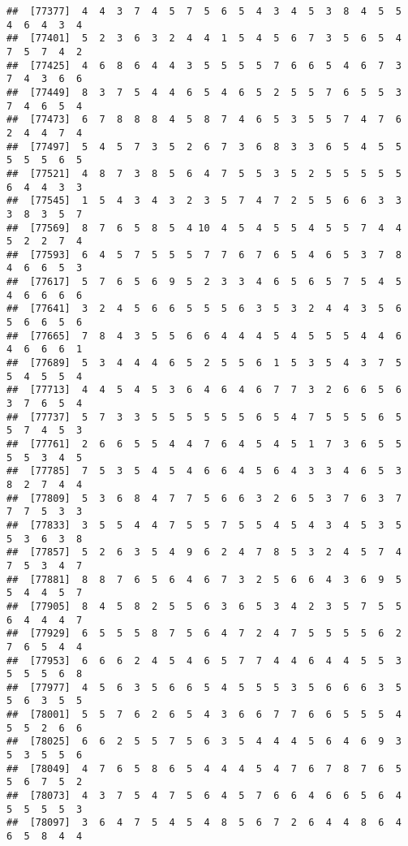 \documentclass[
]{book}
\begin{document}
\begin{verbatim}
##  [77377]  4  4  3  7  4  5  7  5  6  5  4  3  4  5  3  8  4  5  5  4  6  4  3  4
##  [77401]  5  2  3  6  3  2  4  4  1  5  4  5  6  7  3  5  6  5  4  7  5  7  4  2
##  [77425]  4  6  8  6  4  4  3  5  5  5  5  7  6  6  5  4  6  7  3  7  4  3  6  6
##  [77449]  8  3  7  5  4  4  6  5  4  6  5  2  5  5  7  6  5  5  3  7  4  6  5  4
##  [77473]  6  7  8  8  8  4  5  8  7  4  6  5  3  5  5  7  4  7  6  2  4  4  7  4
##  [77497]  5  4  5  7  3  5  2  6  7  3  6  8  3  3  6  5  4  5  5  5  5  5  6  5
##  [77521]  4  8  7  3  8  5  6  4  7  5  5  3  5  2  5  5  5  5  5  6  4  4  3  3
##  [77545]  1  5  4  3  4  3  2  3  5  7  4  7  2  5  5  6  6  3  3  3  8  3  5  7
##  [77569]  8  7  6  5  8  5  4 10  4  5  4  5  5  4  5  5  7  4  4  5  2  2  7  4
##  [77593]  6  4  5  7  5  5  5  7  7  6  7  6  5  4  6  5  3  7  8  4  6  6  5  3
##  [77617]  5  7  6  5  6  9  5  2  3  3  4  6  5  6  5  7  5  4  5  4  6  6  6  6
##  [77641]  3  2  4  5  6  6  5  5  5  6  3  5  3  2  4  4  3  5  6  5  6  6  5  6
##  [77665]  7  8  4  3  5  5  6  6  4  4  4  5  4  5  5  5  4  4  6  4  6  6  6  1
##  [77689]  5  3  4  4  4  6  5  2  5  5  6  1  5  3  5  4  3  7  5  5  4  5  5  4
##  [77713]  4  4  5  4  5  3  6  4  6  4  6  7  7  3  2  6  6  5  6  3  7  6  5  4
##  [77737]  5  7  3  3  5  5  5  5  5  5  6  5  4  7  5  5  5  6  5  5  7  4  5  3
##  [77761]  2  6  6  5  5  4  4  7  6  4  5  4  5  1  7  3  6  5  5  5  5  3  4  5
##  [77785]  7  5  3  5  4  5  4  6  6  4  5  6  4  3  3  4  6  5  3  8  2  7  4  4
##  [77809]  5  3  6  8  4  7  7  5  6  6  3  2  6  5  3  7  6  3  7  7  7  5  3  3
##  [77833]  3  5  5  4  4  7  5  5  7  5  5  4  5  4  3  4  5  3  5  5  3  6  3  8
##  [77857]  5  2  6  3  5  4  9  6  2  4  7  8  5  3  2  4  5  7  4  7  5  3  4  7
##  [77881]  8  8  7  6  5  6  4  6  7  3  2  5  6  6  4  3  6  9  5  5  4  4  5  7
##  [77905]  8  4  5  8  2  5  5  6  3  6  5  3  4  2  3  5  7  5  5  6  4  4  4  7
##  [77929]  6  5  5  5  8  7  5  6  4  7  2  4  7  5  5  5  5  6  2  7  6  5  4  4
##  [77953]  6  6  6  2  4  5  4  6  5  7  7  4  4  6  4  4  5  5  3  5  5  5  6  8
##  [77977]  4  5  6  3  5  6  6  5  4  5  5  5  3  5  6  6  6  3  5  5  6  3  5  5
##  [78001]  5  5  7  6  2  6  5  4  3  6  6  7  7  6  6  5  5  5  4  5  5  2  6  6
##  [78025]  6  6  2  5  5  7  5  6  3  5  4  4  4  5  6  4  6  9  3  5  3  5  5  6
##  [78049]  4  7  6  5  8  6  5  4  4  4  5  4  7  6  7  8  7  6  5  5  6  7  5  2
##  [78073]  4  3  7  5  4  7  5  6  4  5  7  6  6  4  6  6  5  6  4  5  5  5  5  3
##  [78097]  3  6  4  7  5  4  5  4  8  5  6  7  2  6  4  4  8  6  4  6  5  8  4  4

\end{verbatim}
\end{document}
